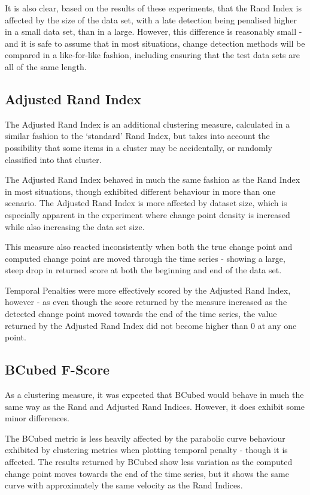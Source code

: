 \documentclass{uvamscse}	%
\begin{document}
It is also clear, based on the results of these experiments, that the Rand Index is affected by the size of the data set, with a late detection being penalised higher in a small data set, than in a large. However, this difference is reasonably small - and it is safe to assume that in most situations, change detection methods will be compared in a like-for-like fashion, including ensuring that the test data sets are all of the same length.

\subsection{Adjusted Rand Index}

The Adjusted Rand Index is an additional clustering measure, calculated in a similar fashion to the `standard' Rand Index, but takes into account the possibility that some items in a cluster may be accidentally, or randomly classified into that cluster.

The Adjusted Rand Index behaved in much the same fashion as the Rand Index in most situations, though exhibited different behaviour in more than one scenario. The Adjusted Rand Index is more affected by dataset size, which is especially apparent in the experiment where change point density is increased while also increasing the data set size.

This measure also reacted inconsistently when both the true change point and computed change point are moved through the time series - showing a large, steep drop in returned score at both the beginning and end of the data set.

Temporal Penalties were more effectively scored by the Adjusted Rand Index, however - as even though the score returned by the measure increased as the detected change point moved towards the end of the time series, the value returned by the Adjusted Rand Index did not become higher than 0 at any one point.

\subsection{BCubed F-Score}

As a clustering measure, it was expected that BCubed would behave in much the same way as the Rand and Adjusted Rand Indices. However, it does exhibit some minor differences.

The BCubed metric is less heavily affected by the parabolic curve behaviour exhibited by clustering metrics when plotting temporal penalty - though it is affected. The results returned by BCubed show less variation as the computed change point moves towards the end of the time series, but it shows the same curve with approximately the same velocity as the Rand Indices.
\end{document}
